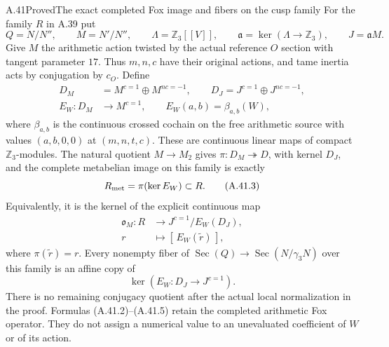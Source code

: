 \begin{statement}{A.41}{Proved}{The exact completed Fox image and fibers on the cusp family}
For the family $R$ in A.39 put
\[
 Q=N/N'',\qquad M=N'/N'',\qquad
 \Lambda=\mathbb Z_3[[V]],\qquad
 \mathfrak a=\ker(\Lambda\to\mathbb Z_3),\qquad J=\mathfrak aM.
 \tag{A.41.1}
\]
Give $M$ the arithmetic action twisted by the actual reference
$O$ section with tangent parameter $17$. Thus $m,n,c$ have
their original actions, and tame inertia acts by conjugation
by $c_O$. Define
\[
\begin{split}
 D_M&=M^{c=1}\oplus M^{nc=-1},\qquad
 D_J=J^{c=1}\oplus J^{nc=-1},\\
 E_W:D_M&\longrightarrow M^{c=1},\qquad
 E_W(a,b)=\beta_{a,b}(W),
\end{split}
 \tag{A.41.2}
\]
where $\beta_{a,b}$ is the continuous crossed cochain on the
free arithmetic source with values $(a,b,0,0)$ at
$(m,n,t,c)$. These are continuous linear maps of compact
$\mathbb Z_3$-modules. The natural quotient $M\to M_2$ gives
$\pi:D_M\twoheadrightarrow D$, with kernel $D_J$, and the
complete metabelian image on this family is exactly
\[
                  R_{\rm met}=\pi(\ker E_W)\subset R.
 \tag{A.41.3}
\]
Equivalently, it is the kernel of the explicit continuous map
\[
\begin{split}
 \mathfrak o_M:R&\longrightarrow
                   J^{c=1}/E_W(D_J),\\
 r&\longmapsto[\,E_W(\widetilde r)\,],
\end{split}
 \tag{A.41.4}
\]
where $\pi(\widetilde r)=r$. Every nonempty fiber of
$\operatorname{Sec}(Q)\to\operatorname{Sec}(N/\gamma_3N)$
over this family is an affine copy of
\[
             \ker(E_W:D_J\longrightarrow J^{c=1}).
 \tag{A.41.5}
\]
There is no remaining conjugacy quotient after the actual
local normalization in the proof. Formulas (A.41.2)--(A.41.5)
retain the completed arithmetic Fox operator. They do not
assign a numerical value to an unevaluated coefficient of
$W$ or of its action.
\end{statement}
